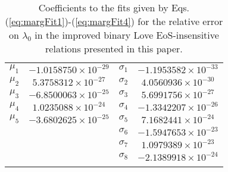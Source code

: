 \documentclass[prd,twocolumn,nofootinbib,superscriptaddress,amsmath,amssymb]{revtex4-1}
\begin{document}
\begin{table}
\centering
\caption{
Coefficients to the fits given by Eqs. (\ref{eq:margFit1})-(\ref{eq:margFit4}) for the relative error on $\lambda_0$ in the improved binary Love EoS-insensitive relations presented in this paper.
}\label{tab:marginalized}
\addtolength{\tabcolsep}{1pt} 
\begin{tabular}{ c | c || c | c}
\hline 
\noalign{\smallskip}
$\mu_1$ & $-1.0158750\times10^{-29}$ & $\sigma_1$ & $-1.1953582\times10^{-33}$\\
$\mu_2$ & $5.3758312\times10^{-27}$ & $\sigma_2$ & $4.0560936\times10^{-30}$\\
$\mu_3$ & $-6.8500063\times10^{-25}$ & $\sigma_3$ & $5.6991756\times10^{-27}$\\
$\mu_4$ & $1.0235088\times10^{-24}$ & $\sigma_4$ & $-1.3342207\times10^{-26}$\\
$\mu_5$ & $-3.6802625\times10^{-25}$ & $\sigma_5$ & $7.1682441\times10^{-24}$\\
 &  & $\sigma_6$ & $-1.5947653\times10^{-23}$\\
 &  & $\sigma_7$ & $1.0979389\times10^{-23}$\\
 &  & $\sigma_8$ & $-2.1389918\times10^{-24}$\\
 \noalign{\smallskip}
 \hline
\end{tabular}
\addtolength{\tabcolsep}{-1pt}
\end{table}
\end{document}
